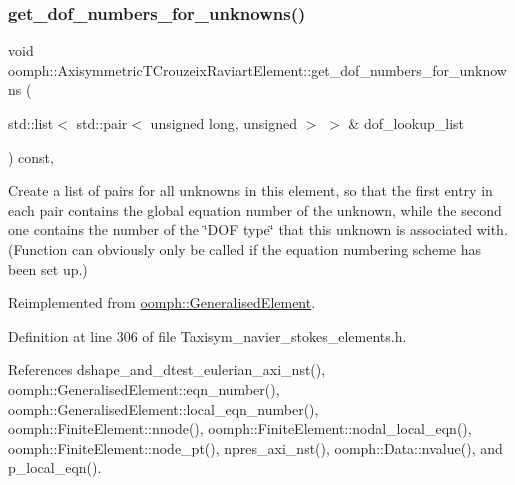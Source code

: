 \mbox{\label{classoomph_1_1AxisymmetricTCrouzeixRaviartElement_adfcf1da97da7737429199f89e182fb00}} 
\subsubsection{\texorpdfstring{get\+\_\+dof\+\_\+numbers\+\_\+for\+\_\+unknowns()}{get\_dof\_numbers\_for\_unknowns()}}
{\footnotesize\ttfamily void oomph\+::\+Axisymmetric\+T\+Crouzeix\+Raviart\+Element\+::get\+\_\+dof\+\_\+numbers\+\_\+for\+\_\+unknowns (\begin{DoxyParamCaption}\item[{std\+::list$<$ std\+::pair$<$ unsigned long, unsigned $>$ $>$ \&}]{dof\+\_\+lookup\+\_\+list }\end{DoxyParamCaption}) const\hspace{0.3cm}{\ttfamily [inline]}, {\ttfamily [virtual]}}



Create a list of pairs for all unknowns in this element, so that the first entry in each pair contains the global equation number of the unknown, while the second one contains the number of the \char`\"{}\+D\+O\+F type\char`\"{} that this unknown is associated with. (Function can obviously only be called if the equation numbering scheme has been set up.) 



Reimplemented from \hyperlink{classoomph_1_1GeneralisedElement_a069f59bfc3e607a5bebba52c6314d777}{oomph\+::\+Generalised\+Element}.



Definition at line 306 of file Taxisym\+\_\+navier\+\_\+stokes\+\_\+elements.\+h.



References dshape\+\_\+and\+\_\+dtest\+\_\+eulerian\+\_\+axi\+\_\+nst(), oomph\+::\+Generalised\+Element\+::eqn\+\_\+number(), oomph\+::\+Generalised\+Element\+::local\+\_\+eqn\+\_\+number(), oomph\+::\+Finite\+Element\+::nnode(), oomph\+::\+Finite\+Element\+::nodal\+\_\+local\+\_\+eqn(), oomph\+::\+Finite\+Element\+::node\+\_\+pt(), npres\+\_\+axi\+\_\+nst(), oomph\+::\+Data\+::nvalue(), and p\+\_\+local\+\_\+eqn().

